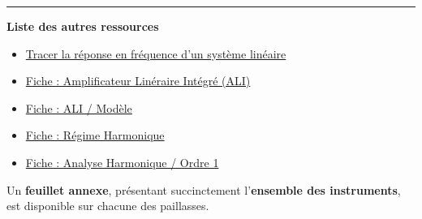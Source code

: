\documentclass[a4paper,11pt]{article} %
\begin{document}
\noindent \rule{\linewidth}{1pt}

\medskip

\textbf{\large Liste des autres ressources}

\begin{itemize}
	\item \hyperref[ressource:RepFreq]{Tracer la réponse en fréquence d'un système linéaire}
	\item \hyperref[fiche:ALI]{Fiche : Amplificateur Linéraire Intégré (ALI)}
	\item \hyperref[fiche:ALIModele]{Fiche : ALI / Modèle}
	\item \hyperref[fiche:RegimeHarmonique]{Fiche : Régime Harmonique}
	\item \hyperref[fiche:AnHaOrdre1]{Fiche : Analyse Harmonique / Ordre 1}
\end{itemize}

\medskip

Un \textbf{feuillet annexe}, présentant succinctement l'\textbf{ensemble des instruments}, est disponible sur chacune des paillasses.

\newpage
\strut %



\newpage
\strut %




\end{document}
